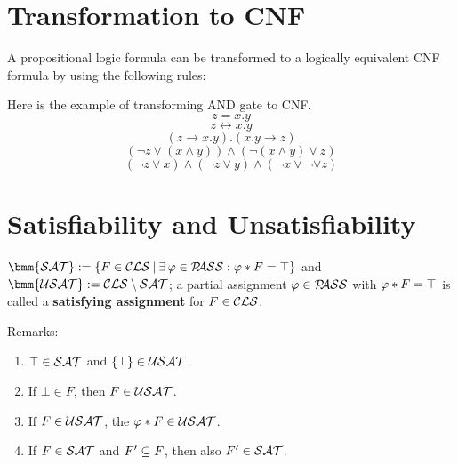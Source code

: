 \documentclass[12pt]{book}
\begin{document}
\section{Transformation to CNF}
\label{sec:Transformation to CNF}

A propositional logic formula can be transformed to a logically equivalent CNF formula by using the following rules:
\begin{enumerate}
   \item $ a = b \Longleftrightarrow a \leftrightarrow b$.
    \item $a \leftrightarrow b \Longleftrightarrow (a \rightarrow b) \wedge (b \rightarrow a)}$.
    \item $ a \rightarrow b \Longleftrightarrow \neg a \vee b$.
	\item $ a + b \Longleftrightarrow a \vee b$.
	\item $ a . b \Longleftrightarrow a \wedge b$.
   \end{enumerate}
   
\begin{examp}\label{exp:tocnf}
 Here is the example of transforming AND gate to CNF.
$$ z = x . y$$
$$ z  \leftrightarrow x . y$$
$$(z \rightarrow x . y) . (x . y \rightarrow z)$$
$$ ( \neg z \vee (x \wedge y)) \wedge (\neg (x \wedge y) \vee z)$$
$$ (\neg z \vee x) \wedge ( \neg z \vee y) \wedge ( \neg x \vee \neg \vee z)$$
\end{examp}  
\section{Satisfiability and Unsatisfiability}
\label{sec:Satisfiability and Unsatisfiability}

\begin{defi}\label{def:sat}
  $\bmm{\Sat} := \set{F \in \Cls \mb \ex\, \vp \in \Pass : \vp * F = \top}$ and $\bmm{\Usat} := \Cls \sm \Sat$; a partial assignment $\varphi \in \mathcal{P\hspace{-0.32em}ASS}$ with $\varphi * F = \top$ is called a \textbf{satisfying assignment} for $F \in \mathcal{CLS}$.
\end{defi}
Remarks:
\begin{enumerate}
\item $\top \in \mathcal{SAT}$ and $\{ \bot \} \in \mathcal{USAT}$.
\item If $\bot \in F$, then $F \in \mathcal{USAT}$.
\item If $F \in \mathcal{USAT}$, the $\varphi * F \in \mathcal{USAT}$.
\item If $F \in \mathcal{SAT}$ and $F' \subseteq F$, then also $F' \in \mathcal{SAT}$.
\end{enumerate}
\end{document}
